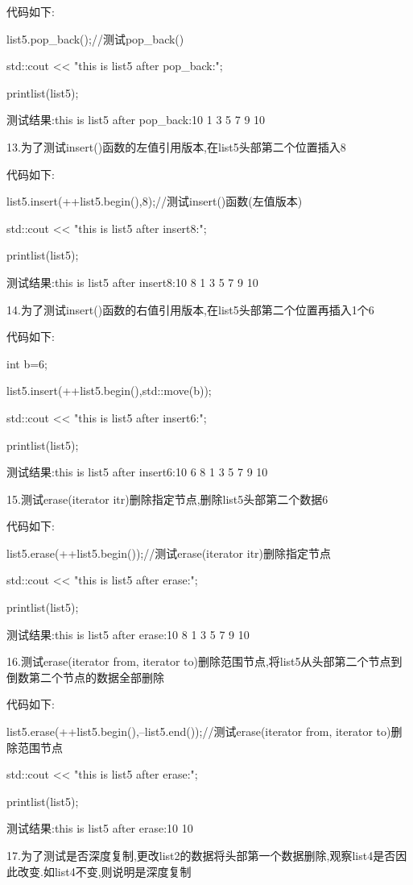 \documentclass[UTF8]{ctexart}
\begin{document}
代码如下:

list5.pop\_back();//测试pop\_back()

std::cout << "this is list5 after pop\_back:";

printlist(list5);

测试结果:this is list5 after pop\_back:10 1 3 5 7 9 10

13.为了测试insert()函数的左值引用版本,在list5头部第二个位置插入8

代码如下:

    list5.insert(++list5.begin(),8);//测试insert()函数(左值版本)
    
    std::cout << "this is list5 after insert8:";
    
    printlist(list5);

测试结果:this is list5 after insert8:10 8 1 3 5 7 9 10

14.为了测试insert()函数的右值引用版本,在list5头部第二个位置再插入1个6

代码如下:

    int b=6;
    
    list5.insert(++list5.begin(),std::move(b));
    
    std::cout << "this is list5 after insert6:";
    
    printlist(list5);   

测试结果:this is list5 after insert6:10 6 8 1 3 5 7 9 10

15.测试erase(iterator itr)删除指定节点,删除list5头部第二个数据6

代码如下:

    
    list5.erase(++list5.begin());//测试erase(iterator itr)删除指定节点
    
    std::cout << "this is list5 after erase:";
    
    printlist(list5);

测试结果:this is list5 after erase:10 8 1 3 5 7 9 10

16.测试erase(iterator from, iterator to)删除范围节点,将list5从头部第二个节点到倒数第二个节点的数据全部删除
    
代码如下:
    
    list5.erase(++list5.begin(),--list5.end());//测试erase(iterator from, iterator to)删除范围节点
    
    std::cout << "this is list5 after erase:";
    
    printlist(list5);

测试结果:this is list5 after erase:10 10

17.为了测试是否深度复制,更改list2的数据将头部第一个数据删除,观察list4是否因此改变.如list4不变,则说明是深度复制
\end{document}
